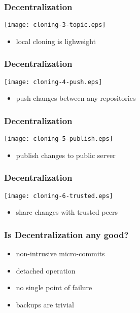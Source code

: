 \documentclass[english]{beamer}
\begin{document}
\begin{frame}
\frametitle{Decentralization}
\texttt{[image: cloning-3-topic.eps]}
\begin{itemize}
        \item local cloning is lighweight
\end{itemize}
\end{frame}

\begin{frame}
\frametitle{Decentralization}
\texttt{[image: cloning-4-push.eps]}
\begin{itemize}
        \item push changes between any repositories
\end{itemize}
\end{frame}

\begin{frame}
\frametitle{Decentralization}
\texttt{[image: cloning-5-publish.eps]}
\begin{itemize}
        \item publish changes to public server
\end{itemize}
\end{frame}

\begin{frame}
\frametitle{Decentralization}
\texttt{[image: cloning-6-trusted.eps]}
\begin{itemize}
        \item share changes with trusted peers
\end{itemize}
\end{frame}

\begin{frame}
\frametitle{Is Decentralization any good?}

\begin{itemize}
        \item non-intrusive micro-commits
        \item detached operation
        \item no single point of failure
        \item backups are trivial
\end{itemize}
\end{frame}
\end{document}
